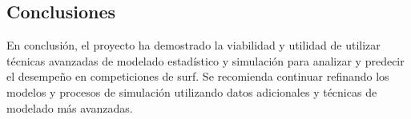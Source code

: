 \documentclass[12pt]{article}
\begin{document}
\subsection*{Conclusiones}

En conclusión, el proyecto ha demostrado la viabilidad y utilidad de utilizar técnicas avanzadas de modelado estadístico y simulación para analizar y predecir el desempeño en competiciones de surf. Se recomienda continuar refinando los modelos y procesos de simulación utilizando datos adicionales y técnicas de modelado más avanzadas.
\end{document}
